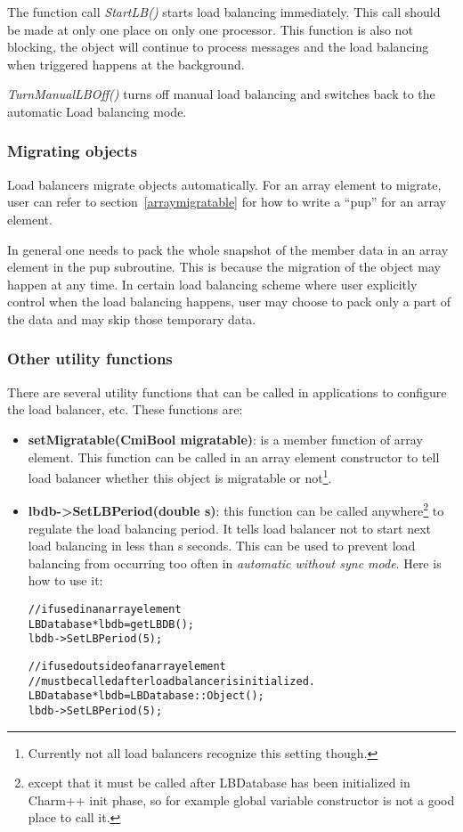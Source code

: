 \begin{enumerate}
The function call {\em StartLB()} starts load balancing immediately. 
This call should be made at only one place on only one processor.
This function is also not blocking, the object will continue to process
messages and the load balancing when triggered
happens at the background.

{\em TurnManualLBOff()} turns off manual load balancing and 
switches back to the automatic Load balancing mode.

\end{enumerate}

\subsubsection{Migrating objects}
\label{lbmigobj}

Load balancers migrate objects automatically.
For an array element to migrate, user can refer to section~\ref{arraymigratable}
for how to write a ``pup'' for an array element.

In general one needs to pack the whole snapshot of the member data in an 
array element in the pup subroutine. This is because the migration of
the object may happen at any time. In certain load balancing scheme where
user explicitly control when the load balancing happens, user may choose
to pack only a part of the data and may skip those temporary data.

\subsubsection{Other utility functions}

There are several utility functions that can be called in applications to
configure the load balancer, etc. These functions are:

\begin{itemize}
\item {\bf setMigratable(CmiBool migratable)}: is a member function of array
      element. This function can be called 
      in an array element constructor to tell load balancer whether this object
      is migratable or not\footnote{Currently not all load balancers 
      recognize this setting though.}.
\item {\bf lbdb->SetLBPeriod(double s)}: this function can be called
      anywhere\footnote{except that it must be called after LBDatabase
      has been initialized in Charm++ init phase, so for example global 
      variable constructor is not a good place to call it.} to regulate 
      the load balancing period. It tells load balancer not to start next 
      load balancing in less than s seconds. This can be used to prevent 
      load balancing from occurring too often in 
      {\em automatic without sync mode}. Here is how to use it:
      \begin{alltt}
// if used in an array element
LBDatabase *lbdb = getLBDB();
lbdb->SetLBPeriod(5);

// if used outside of an array element
// must be called after load balancer is initialized.
LBDatabase *lbdb = LBDatabase::Object();
lbdb->SetLBPeriod(5);
\end{alltt}
\end{itemize}

